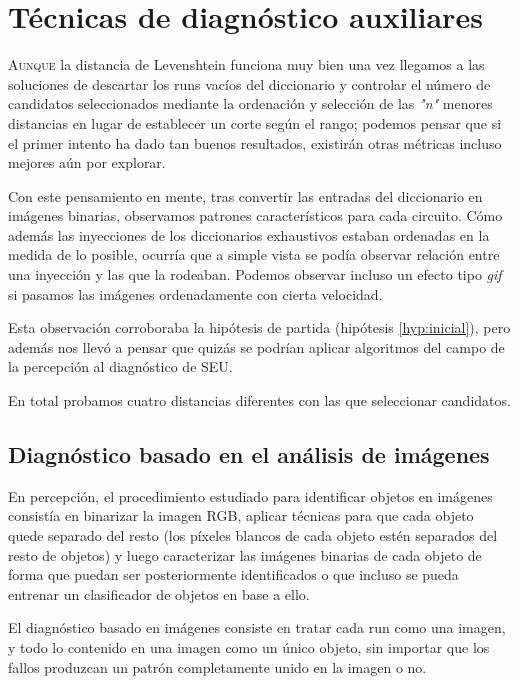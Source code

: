 \chapter{Técnicas de diagnóstico auxiliares}
\label{ch:TecnicasAuxiliares}

\lettrine[lraise=-0.1, lines=2, loversize=0.2]{A}{unque} la distancia de
Levenshtein funciona muy bien una vez llegamos a las soluciones de descartar los 
runs vacíos del diccionario y controlar el número de candidatos seleccionados 
mediante la ordenación y selección de las \textit{"n"} menores distancias en lugar
de establecer un corte según el rango; podemos pensar que si el primer intento ha
dado tan buenos resultados, existirán otras métricas incluso mejores aún por
explorar.

Con este pensamiento en mente, tras convertir las entradas del diccionario en
imágenes binarias, observamos patrones característicos para cada circuito. Cómo
además las inyecciones de los diccionarios exhaustivos estaban ordenadas en la
medida de lo posible, ocurría que a simple vista se podía observar relación entre
una inyección y las que la rodeaban. Podemos observar incluso un efecto tipo
\textit{gif} si pasamos las imágenes ordenadamente con cierta velocidad.

Esta observación corroboraba la hipótesis de partida (hipótesis
\ref{hyp:inicial}), pero además nos llevó a pensar que quizás se podrían aplicar
algoritmos del campo de la percepción al diagnóstico de \gls{SEU}.

En total probamos cuatro distancias diferentes con las que seleccionar candidatos.

\section{Diagnóstico basado en el análisis de imágenes}
\label{sec:HuDist}
En percepción, el procedimiento estudiado para identificar objetos en
imágenes consistía en binarizar la imagen RGB, aplicar técnicas para que cada
objeto quede separado del resto (los píxeles blancos de cada objeto estén
separados del resto de objetos) y luego caracterizar las imágenes binarias de cada
objeto de forma que puedan ser posteriormente identificados o que incluso se pueda
entrenar un clasificador de objetos en base a ello.

El diagnóstico basado en imágenes consiste en tratar cada run como una imagen, 
y todo lo contenido en una imagen como un único objeto, sin importar que los
fallos produzcan un patrón completamente unido en la imagen o no.

